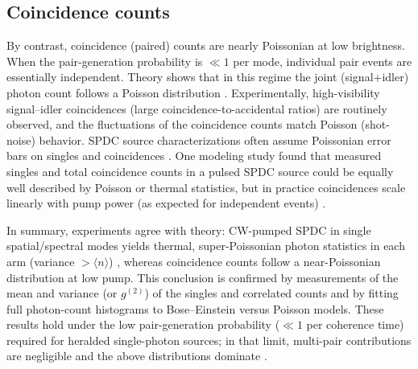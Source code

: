 \subsection*{Coincidence counts}
By contrast, coincidence (paired) counts are nearly Poissonian at low brightness. When the pair-generation probability is $\ll1$ per mode, individual pair events are essentially independent. Theory shows that in this regime the joint (signal+idler) photon count follows a Poisson distribution \cite{avenhausPhotonNumberStatistics2008,christProbingMultimodeSqueezing2011}. Experimentally, high-visibility signal--idler coincidences (large coincidence-to-accidental ratios) are routinely observed, and the fluctuations of the coincidence counts match Poisson (shot-noise) behavior. SPDC source characterizations often assume Poissonian error bars on singles and coincidences \cite{springBosonSamplingPhotonic2013}. One modeling study found that measured singles and total coincidence counts in a pulsed SPDC source could be equally well described by Poisson or thermal statistics, but in practice coincidences scale linearly with pump power (as expected for independent events) \cite{bridaTwinphotonTechniquesPhotodetector2006,avenhausPhotonNumberStatistics2008}.

In summary, experiments agree with theory: CW-pumped SPDC in single spatial/spectral modes yields thermal, super-Poissonian photon statistics in each arm (variance $>\!\langle n\rangle$) \cite{guoParametricDownconversionPhotonpair2016,christProbingMultimodeSqueezing2011}, whereas coincidence counts follow a near-Poissonian distribution at low pump. This conclusion is confirmed by measurements of the mean and variance (or $g^{(2)}$) of the singles and correlated counts \cite{guoParametricDownconversionPhotonpair2016,christProbingMultimodeSqueezing2011} and by fitting full photon-count histograms to Bose--Einstein versus Poisson models. These results hold under the low pair-generation probability ($\ll1$ per coherence time) required for heralded single-photon sources; in that limit, multi-pair contributions are negligible and the above distributions dominate \cite{avenhausPhotonNumberStatistics2008,christProbingMultimodeSqueezing2011}.


